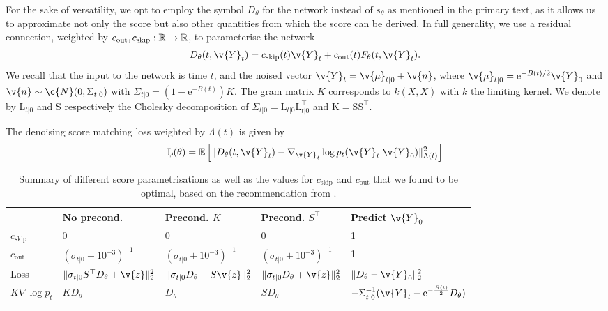 For the sake of versatility, we opt to employ the symbol $D_\theta$ for the network instead of $s_\theta$ as mentioned in the primary text, as it allows us to approximate not only the score but also other quantities from which the score can be derived.
In full generality, we use a residual connection, weighted by ${c}_{\text{out}}, {c}_{\text{skip}}: \mathbb{R} \rightarrow \mathbb{R}$, to parameterise the network \begin{align} D_\theta(t, \v{Y}_t) = c_{\text{skip}}(t) \v{Y}_t + c_{\text{out}}(t) F_\theta(t, \v{Y}_t).
\end{align}
We recall that the input to the network is time $t$, and the noised vector $\v{Y}_t = \v{\mu}_{t|0} + \v{n}$, where $\v{\mu}_{t|0} = \textrm{e}^{-B(t)/2} \v{Y}_0$ and $\v{n} \sim \c{N}(0, \Sigma_{t|0})$ with $\Sigma_{t|0} = (1 - \textrm{e}^{-B(t)}) K$.
The gram matrix $K$ corresponds to $k(X, X)$ with $k$ the limiting kernel.
We denote by $\mathrm{L}_{t|0}$ and $\mathrm{S}$ respectively the Cholesky decomposition of $\Sigma_{t|0}=\mathrm{L}_{t|0} \mathrm{L}_{t|0}^\top$ and $\mathrm{K} = \mathrm{S} \mathrm{S}^\top$.

The denoising score matching loss weighted by $\Lambda(t)$ is given by \begin{align} \label{eq:app:loss} \c{L}(\theta) = \mathbb{E} \left[\| {D}_\theta(t, \v{Y}_t) - \nabla_{{\v{Y}}_t} \log p_{t}(\v{Y}_t| \v{Y}_0)\|_{\Lambda(t)}^2 \right] \end{align} 

\begin{table}[] \centering \small \begin{tabular}{lllll} \toprule                 & No precond.
                                                & Precond. $K$                                & Precond. $S^\top$                         & Predict $\v{Y}_0$                   \\
               \midrule
               $c_\text{skip}$                  & 0                                           & 0                                         & 0                               & 1 \\
               $c_\text{out}$                   & $(\sigma_{t|0} + 10^{-3})^{-1}$             & $(\sigma_{t|0} + 10^{-3})^{-1}$           & $(\sigma_{t|0} + 10^{-3})^{-1}$ & 1 \\
               Loss                             & $\|\sigma_{t|0}
               S^\top D_{\theta} + \v{z}\|_2^2$ & $\|\sigma_{t|0} D_{\theta} + S \v{z}\|_2^2$ & $\|\sigma_{t|0} D_{\theta} + \v{z}\|_2^2$ & $\|D_{\theta} - \v{Y}_0\|^2_2$      \\ $K \nabla \log p_t$ & $K D_\theta$ & $D_\theta$ & $ S D_\theta $ & $-\Sigma_{t|0}^{-1}(\v{Y}_t - \textrm{e}^{{-}\frac{B(t)}{2}} D_\theta)$ \\ \bottomrule\end{tabular} \caption{Summary of different score parametrisations as well as the values for $c_{\text{skip}}$ and $c_{\text{out}}$ that we found to be optimal, based on the recommendation from \textcite[Appendix B.6]{karras2022Elucidating}.
	}\label{tab:app:score-param}
\end{table}

